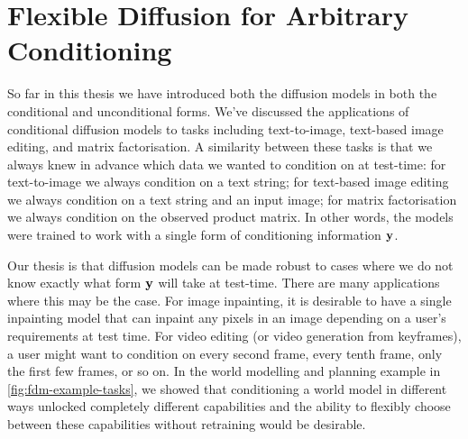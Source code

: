 \chapter{Flexible Diffusion for Arbitrary Conditioning}
\label{ch:flexible-diffusion}



So far in this thesis we have introduced both the diffusion models in both the conditional and unconditional forms. We've discussed the applications of conditional diffusion models to tasks including text-to-image, text-based image editing, and matrix factorisation. A similarity between these tasks is that we always knew in advance which data we wanted to condition on at test-time: for text-to-image we always condition on a text string; for text-based image editing we always condition on a text string and an input image; for matrix factorisation we always condition on the observed product matrix. In other words, the models were trained to work with a single form of conditioning information ${\mathbf{y}}$.

Our thesis is that diffusion models can be made robust to cases where we do not know exactly what form ${\mathbf{y}}$ will take at test-time. There are many applications where this may be the case. For image inpainting, it is desirable to have a single inpainting model that can inpaint any pixels in an image depending on a user's requirements at test time. For video editing (or video generation from keyframes), a user might want to condition on every second frame, every tenth frame, only the first few frames, or so on. In the world modelling and planning example in \cref{fig:fdm-example-tasks}, we showed that conditioning a world model in different ways unlocked completely different capabilities and the ability to flexibly choose between these capabilities without retraining would be desirable.

